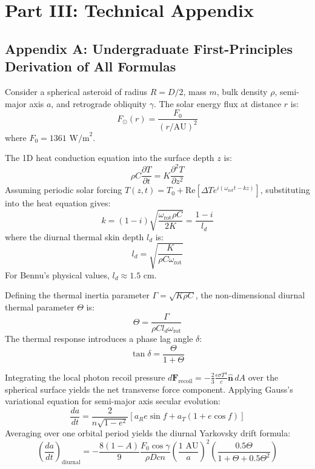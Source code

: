 \documentclass[11pt,a4paper]{article}
\begin{document}
\section*{Part III: Technical Appendix}

\subsection*{Appendix A: Undergraduate First-Principles Derivation of All Formulas}

Consider a spherical asteroid of radius $R = D/2$, mass $m$, bulk density $\rho$, semi-major axis $a$, and retrograde obliquity $\gamma$. The solar energy flux at distance $r$ is:
\begin{equation}
F_{\odot}(r) = \frac{F_0}{(r/\text{AU})^2}
\end{equation}
where $F_0 = 1361\text{ W/m}^2$.

The 1D heat conduction equation into the surface depth $z$ is:
\begin{equation}
\rho C \frac{\partial T}{\partial t} = K \frac{\partial^2 T}{\partial z^2}
\end{equation}
Assuming periodic solar forcing $T(z, t) = T_0 + \mathrm{Re}\left[ \Delta T e^{i(\omega_{\text{rot}} t - k z)} \right]$, substituting into the heat equation gives:
\begin{equation}
k = (1 - i) \sqrt{\frac{\omega_{\text{rot}} \rho C}{2 K}} = \frac{1 - i}{l_d}
\end{equation}
where the diurnal thermal skin depth $l_d$ is:
\begin{equation}
l_d = \sqrt{\frac{K}{\rho C \omega_{\text{rot}}}}
\end{equation}
For Bennu's physical values, $l_d \approx 1.5\text{ cm}$.

Defining the thermal inertia parameter $\Gamma = \sqrt{K \rho C}$, the non-dimensional diurnal thermal parameter $\Theta$ is:
\begin{equation}
\Theta = \frac{\Gamma}{\rho C l_d \omega_{\text{rot}}}
\end{equation}
The thermal response introduces a phase lag angle $\delta$:
\begin{equation}
\tan \delta = \frac{\Theta}{1 + \Theta}
\end{equation}

Integrating the local photon recoil pressure $d\mathbf{F}_{\text{recoil}} = -\frac{2}{3} \frac{\epsilon \sigma T^4}{c} \hat{\mathbf{n}} \, dA$ over the spherical surface yields the net transverse force component. Applying Gauss's variational equation for semi-major axis secular evolution:
\begin{equation}
\frac{da}{dt} = \frac{2}{n \sqrt{1 - e^2}} \left[ a_R e \sin f + a_T (1 + e \cos f) \right]
\end{equation}
Averaging over one orbital period yields the diurnal Yarkovsky drift formula:
\begin{equation}
\left( \frac{da}{dt} \right)_{\text{diurnal}} = -\frac{8 (1 - A)}{9} \frac{F_0 \cos \gamma}{\rho D c n} \left( \frac{\text{1 AU}}{a} \right)^2 \left( \frac{0.5 \Theta}{1 + \Theta + 0.5 \Theta^2} \right)
\end{equation}
\end{document}
